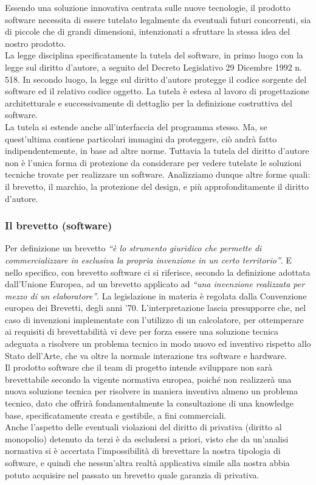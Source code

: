 Essendo una soluzione innovativa centrata sulle nuove tecnologie, il prodotto software necessita di essere tutelato legalmente da eventuali futuri concorrenti, sia di piccole che di grandi dimensioni, intenzionati a sfruttare la stessa idea del nostro prodotto.\\
La legge disciplina specificatamente la tutela del software, in primo luogo con la legge sul diritto d'autore, a seguito del Decreto Legislativo 29 Dicembre 1992 n. 518. In secondo luogo, la legge sul diritto d'autore protegge il codice sorgente del software ed il relativo codice oggetto. La tutela è estesa al lavoro di progettazione architetturale e successivamente di dettaglio per la definizione costruttiva del software.\\
La tutela si estende anche all'interfaccia del programma stesso. Ma, se quest'ultima contiene particolari immagini da proteggere, ciò andrà fatto indipendentemente, in base ad altre norme. Tuttavia la tutela del diritto d'autore non è l'unica forma di protezione da considerare per vedere tutelate le soluzioni tecniche trovate per realizzare un software. Analizziamo dunque altre forme quali: il brevetto, il marchio, la protezione del design, e più approfonditamente il diritto d'autore.

\subsubsection{Il brevetto (software)}
Per definizione un brevetto \textit{``è lo strumento giuridico che permette di commercializzare in esclusiva la propria invenzione in un certo territorio''}. E nello specifico, con brevetto software ci si riferisce, secondo la definizione adottata dall'Unione Europea, ad un brevetto applicato ad \textit{``una invenzione realizzata per mezzo di un elaboratore''}. La legislazione in materia è regolata dalla Convenzione europea dei Brevetti, degli anni '70. L'interpretazione lascia presupporre che, nel caso di invenzioni implementate con l'utilizzo di un calcolatore, per ottemperare ai requisiti di brevettabilità vi deve per forza essere una soluzione tecnica adeguata a risolvere un problema tecnico in modo nuovo ed inventivo rispetto allo Stato dell'Arte, che va oltre la normale interazione tra software e hardware.\\
Il prodotto software che il team di progetto intende sviluppare non sarà brevettabile secondo la vigente normativa europea, poiché non realizzerà una nuova soluzione tecnica per risolvere in maniera inventiva almeno un problema tecnico, dato che offrirà fondamentalmente la consultazione di una knowledge base, specificatamente creata e gestibile, a fini commerciali.\\
Anche l'aspetto delle eventuali violazioni del diritto di privativa (diritto al monopolio) detenuto da terzi è da escludersi a priori, visto che da un'analisi normativa si è accertata l'impossibilità di brevettare la nostra tipologia di software, e quindi che nessun'altra realtà applicativa simile alla nostra abbia potuto acquisire nel passato un brevetto quale garanzia di privativa.

